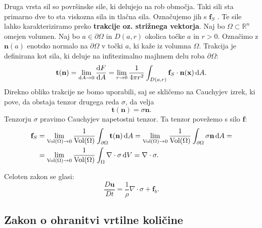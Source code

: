 \documentclass[mat2, tisk]{fmfdelo}
\newcommand{\R}{\mathbb R}
\newcommand{\bd}{\textbf}
\begin{document}
Druga vrsta sil so površinske sile, ki delujejo na rob območja. 
Taki sili sta primarno dve to sta viskozna sila in tlačna sila.
Označujemo jih s $\bd{f}_S$ .
Te sile lahko karakteriziramo preko \bd{trakcije oz. strižnega vektorja}.
Naj bo $\Omega \subset \R^n$ omejen volumen. Naj bo $a\in \partial \Omega$ in 
$D(a, r)$ okolica točke $a$ in $r>0$. Označimo z $\bd{n}(a)$ enotsko normalo na $\partial \Omega$ v točki $a$, ki kaže iz volumna $\Omega$.
Trakcija je definirana kot sila, ki deluje na infitezimalno majhnem delu roba $\partial \Omega$:
\begin{equation}
\bd{t}(\bd{n}) = \lim_{\dif A \rightarrow 0} \frac{\dif F}{\dif A} = \lim_{r \rightarrow 0} \frac{1}{4\pi r^2} \int_{D(a, r)} \bd{f}_S \cdot \bd{n}(\bd{x}) \dif A.
\end{equation}
Direkno obliko trakcije ne bomo uporabili, saj se skličemo na Cauchyjev izrek, ki pove, da obstaja tenzor drugega reda $\sigma$, 
da velja 
$$
\bd{t}(\bd{n}) = \sigma \bd{n}.
$$
Tenzorju $\sigma$ pravimo Cauchyjev napetostni tenzor. 
Ta tenzor povežemo s silo $\bd{f}$: 
\begin{align*}
\bd{f}_S &= \lim_{\text{Vol}(\Omega) \rightarrow 0} \frac{1}{\text{Vol}(\Omega)} \int_{\partial \Omega} \bd{t}(\bd{n}) \dif A = \lim_{\text{Vol}(\Omega) \rightarrow 0} \frac{1}{\text{Vol}(\Omega)} \int_{\partial \Omega} \sigma \bd{n} \dif A = \\
&= \lim_{\text{Vol}(\Omega) \rightarrow 0} \frac{1}{\text{Vol}(\Omega)} \int_{\Omega} \nabla \cdot \sigma \dif V = \nabla \cdot \sigma.
\end{align*}

Celoten zakon se glasi:
\begin{equation}
\frac{D \bd{u}}{D t} = \frac{1}{\rho} \nabla \cdot \sigma + \bd{f}_b.
\end{equation}

\subsection{Zakon o ohranitvi vrtilne količine}
\end{document}
